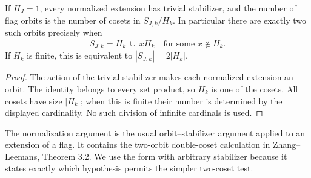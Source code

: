 \begin{corollary}\label{cor:twofiber}
If $H_J=1$, every normalized extension has trivial stabilizer, and the number of flag orbits is the number of cosets in $S_{J,k}/H_k$. In particular there are exactly two such orbits precisely when
\[
                 S_{J,k}=H_k\ \dot\cup\ xH_k
                 \quad\text{for some }x\notin H_k.
\]
If $H_k$ is finite, this is equivalent to $|S_{J,k}|=2|H_k|$.
\end{corollary}
\begin{proof}
The action of the trivial stabilizer makes each normalized extension an orbit. The identity belongs to every set product, so $H_k$ is one of the cosets. All cosets have size $|H_k|$; when this is finite their number is determined by the displayed cardinality. No such division of infinite cardinals is used.
\end{proof}

The normalization argument is the usual orbit--stabilizer argument applied to an extension of a flag. It contains the two-orbit double-coset calculation in Zhang--Leemans, Theorem 3.2. We use the form with arbitrary stabilizer because it states exactly which hypothesis permits the simpler two-coset test.
